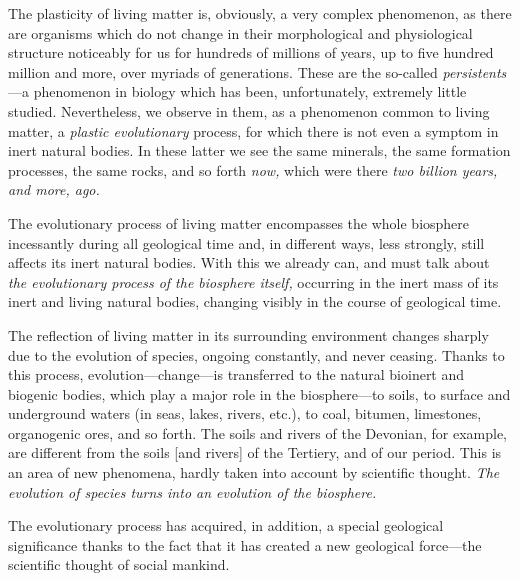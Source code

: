 The plasticity of living matter is, obviously, a very complex phenomenon, as
there are organisms which do not change in their morphological and
physiological structure noticeably for us for hundreds of millions of years, up
to five hundred million and more, over myriads of generations.  These are the
so-called \emph{persistents}\fncomma{}---a phenomenon in biology which has been, unfortunately, extremely little
studied.  Nevertheless, we observe in them, as a phenomenon common to living
matter, a \emph{plastic evolutionary} process, for which there is not even a
symptom in inert natural bodies.  In these latter we see the same minerals, the
same formation processes, the same rocks, and so forth \emph{now,} which were
there \emph{two billion years, and more, ago.}

The evolutionary process of living matter encompasses the whole biosphere
incessantly during all geological time and, in different ways, less strongly,
still affects its inert natural bodies.  With this we already can, and must
talk about \emph{the evolutionary process of the biosphere itself,} occurring
in the inert mass of its inert and living natural
bodies, changing visibly in the course of geological time.

The reflection of living matter in its surrounding environment changes sharply
due to the evolution of species, ongoing constantly, and never ceasing.  Thanks
to this process, evolution---change---is transferred to the natural bioinert
and biogenic bodies, which play a major role in the biosphere---to soils, to
surface and underground waters (in seas, lakes, rivers, etc.), to coal,
bitumen, limestones, organogenic ores, and so forth.  The soils and rivers of
the Devonian, for example, are different from the soils [and
rivers] of the Tertiery, and of our period.  This is an area of new phenomena, hardly
taken into account by scientific thought.  \emph{The evolution of species turns
into an evolution of the biosphere.}


\Section \label{sec:9}%
The evolutionary process has acquired, in addition, a special geological
significance thanks to the fact that it has created a new geological
force---the scientific thought of social mankind.

